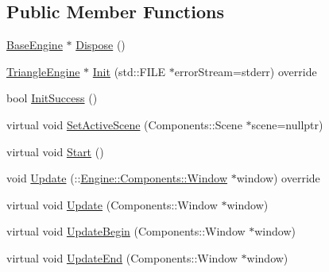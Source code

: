 \subsection*{Public Member Functions}
\begin{DoxyCompactItemize}
\item 
\mbox{\hyperlink{classEngine_1_1BaseEngine_ad838c97afe1790cb35527f0b58e81e6b}{Base\+Engine}} $\ast$ \mbox{\hyperlink{classEngine_1_1BaseEngine_acd5cd5d2189d24e038b23477b7dce405}{Dispose}} ()
\item 
\mbox{\hyperlink{classApplication_1_1Engines_1_1TriangleEngine}{Triangle\+Engine}} $\ast$ \mbox{\hyperlink{classApplication_1_1Engines_1_1TriangleEngine_a4fc68c683c3beaadf7d41f36627d3492}{Init}} (std\+::\+F\+I\+LE $\ast$error\+Stream=stderr) override
\item 
bool \mbox{\hyperlink{classEngine_1_1BaseEngine_a7a1c9b833049b3eb61194cab113dfe89}{Init\+Success}} ()
\item 
virtual void \mbox{\hyperlink{classEngine_1_1BaseEngine_afc82c6a00d5a9d4714740fc5eab5db86}{Set\+Active\+Scene}} (Components\+::\+Scene $\ast$scene=nullptr)
\item 
virtual void \mbox{\hyperlink{classEngine_1_1BaseEngine_a525fdc7a1da7eecb514ad5763f06be79}{Start}} ()
\item 
void \mbox{\hyperlink{classApplication_1_1Engines_1_1TriangleEngine_a0578bee716800df84d59f13c291bc6d0}{Update}} (\+::\mbox{\hyperlink{classEngine_1_1Components_1_1Window}{Engine\+::\+Components\+::\+Window}} $\ast$window) override
\item 
virtual void \mbox{\hyperlink{classEngine_1_1BaseEngine_a01c23c2073f08939a660f3b7a866852c}{Update}} (Components\+::\+Window $\ast$window)
\item 
virtual void \mbox{\hyperlink{classEngine_1_1BaseEngine_aace6be2a42d12b64fbd35f1acdb08408}{Update\+Begin}} (Components\+::\+Window $\ast$window)
\item 
virtual void \mbox{\hyperlink{classEngine_1_1BaseEngine_a7c07c98e583df042a0eb01e0ddec85a1}{Update\+End}} (Components\+::\+Window $\ast$window)
\end{DoxyCompactItemize}
